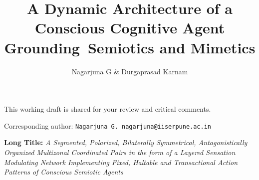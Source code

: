 \documentclass[twoside, nobib]{tufte-handout}
\title{A Dynamic Architecture of a Conscious Cognitive Agent Grounding~Semiotics and Mimetics}
\author[Nagarjuna \& Durgaprasad]{Nagarjuna G \& Durgaprasad Karnam}
\begin{document}
\maketitle%
\vspace{0.5cm}
\noindent This working draft is shared for your review and critical comments. 

\vspace{0.5cm}
\noindent Corresponding author: \texttt{Nagarjuna G. nagarjuna@iiserpune.ac.in} 

\vspace{0.5cm}
\noindent \textbf{Long Title:} \textit{A Segmented, Polarized, Bilaterally Symmetrical, Antagonistically Organized Multizonal Coordinated Pairs in the form of a Layered Sensation Modulating Network Implementing Fixed, Haltable and Transactional Action Patterns of Conscious Semiotic Agents}
\end{document}
